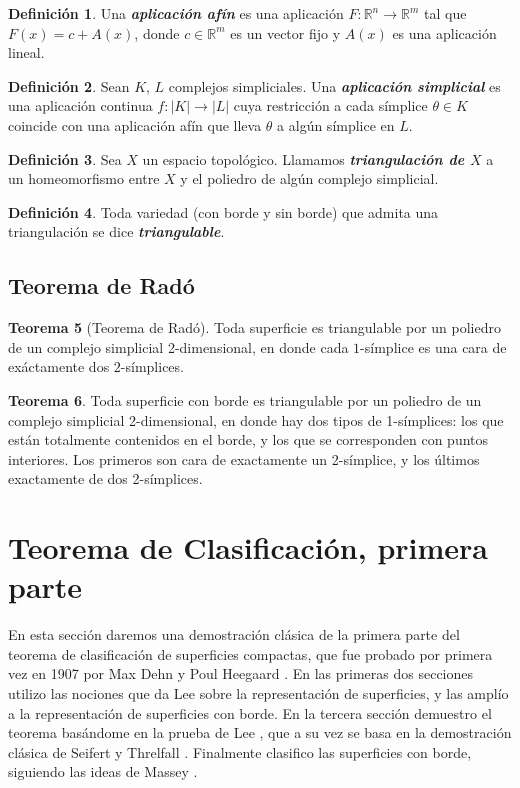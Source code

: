 \documentclass[10pt]{report}
\newcommand{\R}{\mathbb{R}}
\newcommand{\enfatiza}[1]{\textbf{\textit{#1}}}
\theoremstyle{definition}
\newtheorem{defin}{Definición}[section]
\newtheorem{tma}[defin]{Teorema}
\begin{document}
\begin{defin}
Una \enfatiza{aplicación afín} es una aplicación $F:\R^n \to \R^m$ tal que $F(x)=c+A(x)$, donde $c\in \R^m$ es un vector fijo y $A(x)$ es una aplicación lineal.
\end{defin}
\begin{defin}
Sean $K, \, L$ complejos simpliciales. Una \enfatiza{aplicación simplicial} es una aplicación continua $f:|K|\to |L|$ cuya restricción a cada símplice $\theta \in K$ coincide con una aplicación afín que lleva $\theta$ a algún símplice en $L$.
\end{defin}
\begin{defin}%
Sea $X$ un espacio topológico. Llamamos \enfatiza{triangulación de $X$} a un homeomorfismo entre $X$ y el poliedro de algún complejo simplicial.
\end{defin}

\begin{defin}%
Toda variedad (con borde y sin borde) que admita una triangulación se dice \enfatiza{triangulable}.
\end{defin}



\section{Teorema de Radó}

\begin{tma}[Teorema de Radó]
Toda superficie es triangulable por un poliedro de un complejo simplicial 2-dimensional, en donde cada $1$-símplice es una cara de exáctamente dos $2$-símplices.\label{teo:rado}
\end{tma}

\begin{tma}
Toda superficie con borde es triangulable por un poliedro de un complejo simplicial 2-dimensional, en donde hay dos tipos de 1-símplices: los que están totalmente contenidos en el borde, y los que se corresponden con puntos interiores. Los primeros son cara de exactamente un 2-símplice, y los últimos exactamente de dos 2-símplices.
\end{tma}

\clearpage

\chapter{Teorema de Clasificación, primera parte}
En esta sección daremos una demostración clásica de la primera parte del teorema de clasificación de superficies compactas, que fue probado por primera vez en 1907 por Max Dehn y Poul Heegaard \cite{dehn}. En las primeras dos secciones utilizo las nociones que da Lee \cite{lee1} sobre la representación de superficies, y las amplío a la representación de superficies con borde. En la tercera sección demuestro el teorema basándome en la prueba de Lee \cite{lee1}, que a su vez se basa en la demostración clásica de Seifert y Threlfall \cite{seifert}. Finalmente clasifico las superficies con borde, siguiendo las ideas de Massey \cite{massey}.
\end{document}
